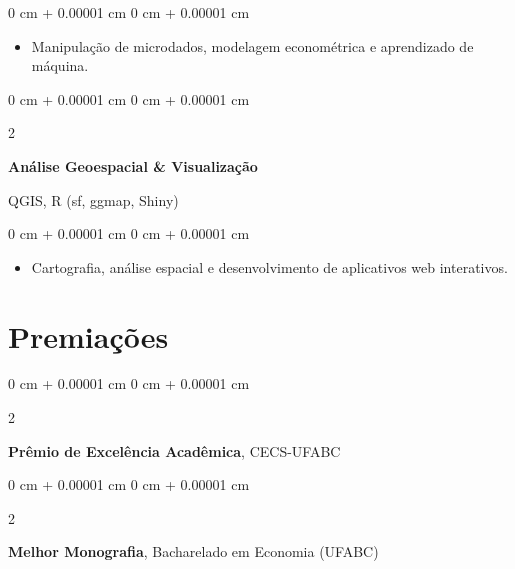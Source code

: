 \documentclass[10pt, letterpaper]{article}
\newenvironment{highlights}{
    \begin{itemize}[
        topsep=0.10 cm,
        parsep=0.10 cm,
        partopsep=0pt,
        itemsep=0pt,
        leftmargin=0 cm + 10pt
    ]
}{
    \end{itemize}
} %
\newenvironment{onecolentry}{
    \begin{adjustwidth}{
        0 cm + 0.00001 cm
    }{
        0 cm + 0.00001 cm
    }
}{
    \end{adjustwidth}
} %
\newenvironment{twocolentry}[2][]{
    \onecolentry
    \def\secondColumn{#2}
    \setcolumnwidth{\fill, 4.5 cm}
    \begin{paracol}{2}
}{
    \switchcolumn \raggedleft \secondColumn
    \end{paracol}
    \endonecolentry
} %
\begin{document}
\vspace{0.10 cm}
\begin{onecolentry}
    \begin{highlights}
        \item Manipulação de microdados, modelagem econométrica e aprendizado de máquina.
    \end{highlights}
\end{onecolentry}

\vspace{0.2 cm}

\begin{twocolentry}{
    QGIS, R (sf, ggmap, Shiny)
}
    \textbf{Análise Geoespacial \& Visualização}
\end{twocolentry}

\vspace{0.10 cm}
\begin{onecolentry}
    \begin{highlights}
        \item Cartografia, análise espacial e desenvolvimento de aplicativos web interativos.
    \end{highlights}
\end{onecolentry}


\section{Premiações}

\begin{twocolentry}{
    2018
}
    \textbf{Prêmio de Excelência Acadêmica}, CECS-UFABC
\end{twocolentry}

\vspace{0.2 cm}

\begin{twocolentry}{
    2017
}
    \textbf{Melhor Monografia}, Bacharelado em Economia (UFABC)
\end{twocolentry}
\end{document}
